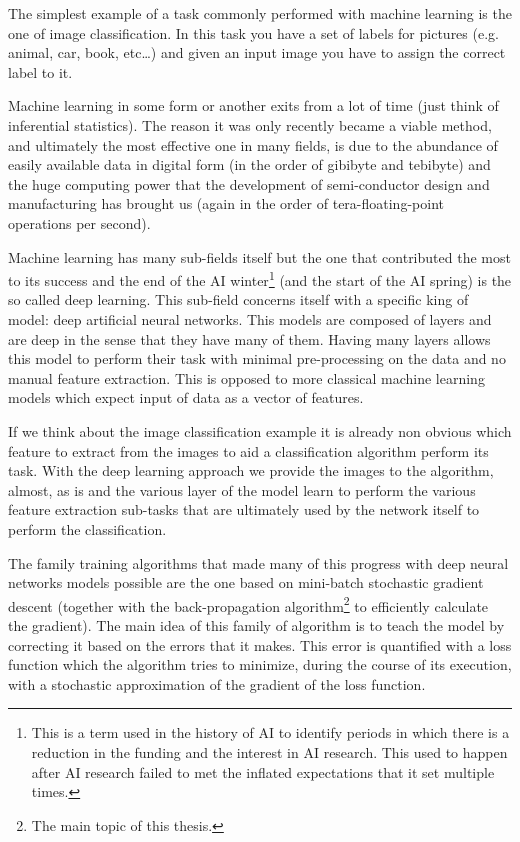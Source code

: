 \documentclass{report}
\begin{document}
The simplest example of a task commonly performed with machine learning is the
one of image classification. In this task you have a set of labels for pictures
(e.g. animal, car, book, etc\dots) and given an input image you have to assign
the correct label to it.

Machine learning in some form or another exits from a lot of time (just think of
inferential statistics). The reason it was only recently became a viable method,
and ultimately the most effective one in many fields, is due to the abundance of
easily available data in digital form (in the order of gibibyte and tebibyte)
and the huge computing power that the development of semi-conductor design and
manufacturing has brought us (again in the order of tera-floating-point
operations per second).

Machine learning has many sub-fields itself but the one that contributed the
most to its success and the end of the AI winter\footnote{This is a term used
in the history of AI to identify periods in which there is a reduction in the
funding and the interest in AI research. This used to happen after AI research
failed to met the inflated expectations that it set multiple times.} (and the
start of the AI spring) is the so called deep learning. This sub-field concerns
itself with a specific king of model: deep artificial neural networks. This
models are composed of layers and are deep in the sense that they have many of
them. Having many layers allows this model to perform their task with minimal
pre-processing on the data and no manual feature extraction. This is opposed to
more classical machine learning models which expect input of data as a vector
of features.

If we think about the image classification example it is already non obvious
which feature to extract from the images to aid a classification algorithm
perform its task. With the deep learning approach we provide the images to the
algorithm, almost, as is and the various layer of the model learn to perform
the various feature extraction sub-tasks that are ultimately used by the
network itself to perform the classification.

The family training algorithms that made many of this progress with deep neural
networks models possible are the one based on mini-batch stochastic gradient
descent (together with the back-propagation algorithm\footnote{The main topic
of this thesis.} to efficiently calculate the gradient). The main idea of this
family of algorithm is to teach the model by correcting it based on the errors
that it makes. This error is quantified with a loss function which the algorithm
tries to minimize, during the course of its execution, with a stochastic
approximation of the gradient of the loss function.
\end{document}

